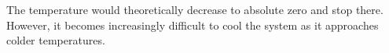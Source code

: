 The temperature would theoretically decrease to absolute zero and stop there. However, it becomes increasingly difficult to cool the system as it approaches colder temperatures.